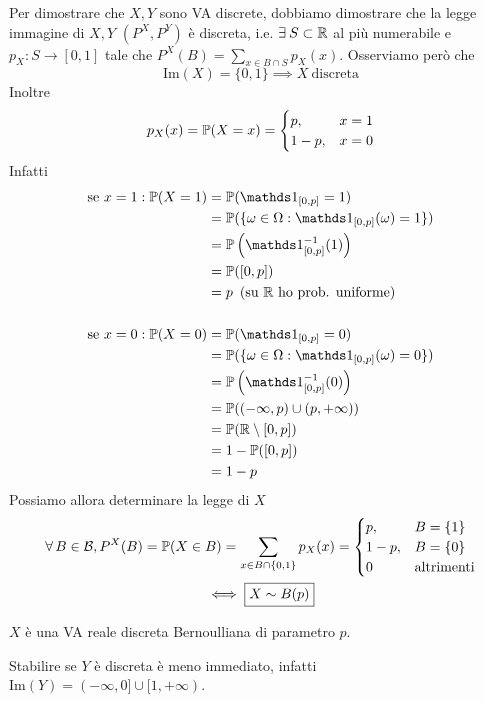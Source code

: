 \begin{enumerate}
Per dimostrare che $X,Y$ sono VA discrete, dobbiamo dimostrare che la legge immagine di $X,Y$ $\left(P^{X} ,P^{Y}\right)$ è discreta, i.e. $\exists S\subset \RR$ al più numerabile e $p_{X} :S\rightarrow [0,1]$ tale che $P^{X}(B) =\sum\limits_{x\in B\cap S} p_{X}(x)$. Osserviamo però che
\begin{equation*}
\mathrm{Im}(X) =\{0,1\} \implies X\ \text{discreta}
\end{equation*}
Inoltre
\begin{equation*}
p_{X}(x) =\mathbb{P}(X=x) =
\begin{cases}
p, & x=1\\
1-p, & x=0
\end{cases}
\end{equation*}
Infatti
\begin{align*}
\text{se} \ x=1:\PP(X=1) & =\PP(\Ind_{[0,p]} =1)\\
 & =\PP(\{\omega \in \Omega :\Ind_{[0,p]}(\omega) =1\})\\
 & =\PP\left(\Ind_{[0,p]}^{-1}(1)\right)\\
 & =\PP([0,p])\\
 & =p\ \left(\text{su} \ \RR \ \text{ho prob. uniforme}\right)\\
 & \\
\text{se} \ x=0:\PP(X=0) & =\PP(\Ind_{[0,p]} =0)\\
 & =\PP(\{\omega \in \Omega :\Ind_{[0,p]}(\omega) =0\})\\
 & =\PP\left(\Ind_{[0,p]}^{-1}(0)\right)\\
 & =\PP((-\infty ,p) \cup (p,+\infty))\\
 & =\PP(\RR \setminus [0,p])\\
 & =1-\PP([0,p])\\
 & =1-p
\end{align*}
Possiamo allora determinare la legge di $X$
\begin{gather*}
\forall B\in \mathcal{B} ,P^{X}(B) =\PP(X\in B) =\sum\limits_{x\in B\cap \{0,1\}} p_{X}(x)
=
\begin{cases}
p, & B=\{1\}\\
1-p, & B=\{0\}\\
0 & \text{altrimenti}
\end{cases}\\
\iff \boxed{X\sim B(p)}
\end{gather*}

$X$ è una VA reale discreta Bernoulliana di parametro $p$.

Stabilire se $Y$ è discreta è meno immediato, infatti $\mathrm{Im}(Y) =(-\infty ,0] \cup [ 1,+\infty)$.


\end{enumerate}
